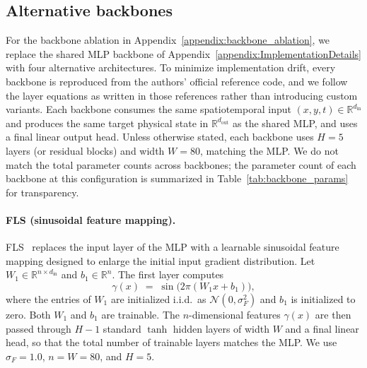 \documentclass{article}
\theoremstyle{plain}
\theoremstyle{definition}
\theoremstyle{remark}
\begin{document}
\subsection{Alternative backbones}
\label{appendix:backbone_implementations}

For the backbone ablation in
Appendix~\ref{appendix:backbone_ablation}, we replace the shared MLP backbone
of Appendix~\ref{appendix:ImplementationDetails} with four alternative
architectures. To minimize implementation drift, every backbone is reproduced
from the authors' official reference code, and we follow the layer equations
as written in those references rather than introducing custom variants.
Each backbone consumes the same spatiotemporal input
$(x,y,t)\in\mathbb{R}^{d_\mathrm{in}}$ and produces the same target physical
state in $\mathbb{R}^{d_\mathrm{out}}$ as the shared MLP, and uses a final
linear output head. Unless otherwise stated, each backbone uses $H=5$ layers
(or residual blocks) and width $W=80$, matching the MLP. We do not match the
total parameter counts across backbones; the parameter count of each backbone
at this configuration is summarized in Table~\ref{tab:backbone_params} for
transparency.

\paragraph{FLS (sinusoidal feature mapping).}
FLS~\cite{Wong2022FLS} replaces the input layer of the MLP with a
learnable sinusoidal feature mapping designed to enlarge the initial input
gradient distribution. Let $W_1\in\mathbb{R}^{n\times d_\mathrm{in}}$ and
$b_1\in\mathbb{R}^{n}$. The first layer computes
\begin{equation}
    \gamma(x) \;=\; \sin\!\big(2\pi (W_1 x + b_1)\big),
\end{equation}
where the entries of $W_1$ are initialized i.i.d.\ as
$\mathcal{N}(0,\sigma_F^{2})$ and $b_1$ is initialized to zero. Both $W_1$
and $b_1$ are trainable. The $n$-dimensional features $\gamma(x)$ are then
passed through $H-1$ standard $\tanh$ hidden layers of width $W$ and a final
linear head, so that the total number of trainable layers matches the MLP.
We use $\sigma_F=1.0$, $n=W=80$, and $H=5$.
\end{document}
